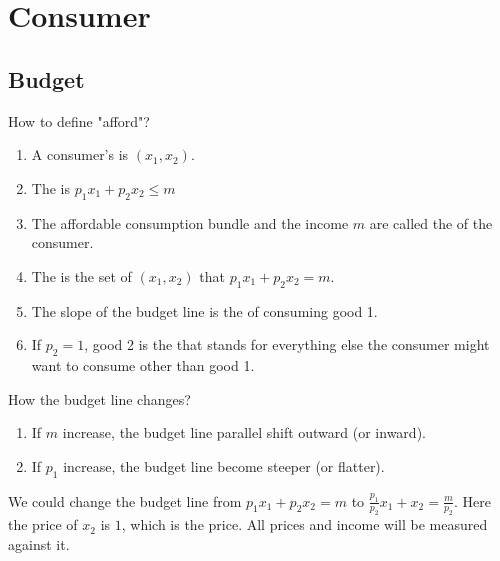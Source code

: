\section{Consumer}

\subsection{Budget}

\begin{definition}
    How to define "afford"?
    \begin{enumerate}
        \item A consumer's  is $(x_1, x_2)$.
        \item The  is $p_1 x_1 + p_2 x_2 \leq m$
        \item The affordable consumption bundle and the income $m$ are called the  of the consumer.
        \item The  is the set of $(x_1, x_2)$ that $p_1 x_1 + p_2 x_2 = m$.
        \item The slope of the budget line is the  of consuming good 1.
        \item If $p_2 = 1$, good 2 is the  that stands for everything else the consumer might want to consume other than good 1.    \end{enumerate}
\end{definition}

How the budget line changes?
\begin{enumerate}
    \item If $m$ increase, the budget line parallel shift outward (or inward).
    \item If $p_1$ increase, the budget line become steeper (or flatter).
\end{enumerate}

We could change the budget line from $p_1 x_1 + p_2 x_2 = m$ to $\displaystyle \frac{p_1}{p_2} x_1 + x_2 = \frac{m}{p_2}$. Here the price of $x_2$ is $1$, which is the  price. All prices and income will be measured against it.

